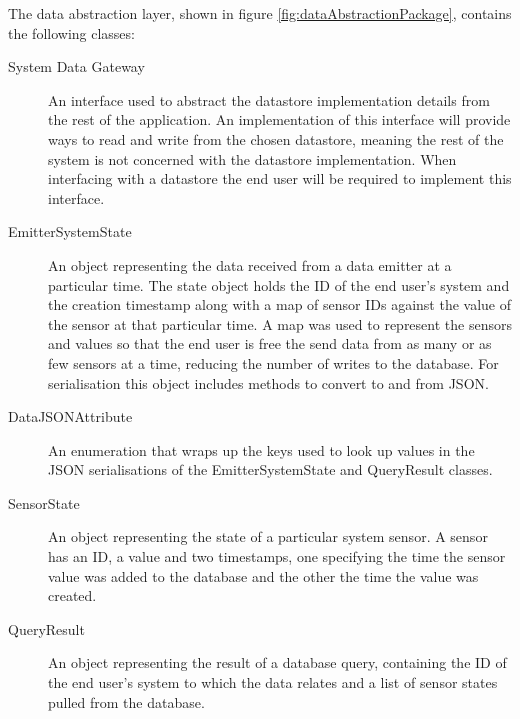 \documentclass[10pt,a4paper]{article}
\begin{document}
The data abstraction layer, shown in figure \ref{fig:dataAbstractionPackage}, contains the following classes:
\begin{description}
\item [System Data Gateway]  An interface used to abstract the datastore implementation details from the rest of the application. An implementation of this interface will provide ways to read and write from the chosen datastore, meaning the rest of the system is not concerned with the datastore implementation. When interfacing with a datastore the end user will be required to implement this interface.
\item [EmitterSystemState] An object representing the data received from a data emitter at a particular time. The state object holds the ID of the end user's system and the creation timestamp along with a map of sensor IDs against the value of the sensor at that particular time. A map was used to represent the sensors and values so that the end user is free the send data from as many or as few sensors at a time, reducing the number of writes to the database. For serialisation this object includes methods to convert to and from JSON.
\item [DataJSONAttribute] An enumeration that wraps up the keys used to look up values in the JSON serialisations of the EmitterSystemState and QueryResult classes.
\item [SensorState] An object representing the state of a particular system sensor. A sensor has an ID, a value and two timestamps, one specifying the time the sensor value was added to the database and the other the time the value was created.
\item [QueryResult] An object representing the result of a database query, containing the ID of the end user's system to which the data relates and a list of sensor states pulled from the database.


\end{description}
\end{document}
